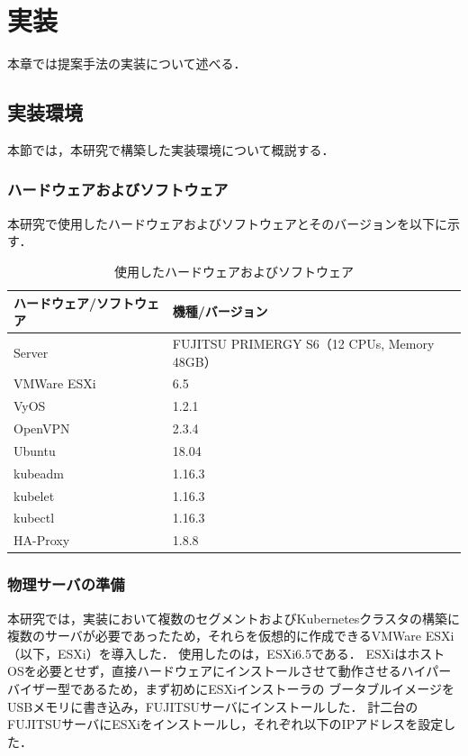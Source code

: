\chapter{実装}
\label{implementation}

本章では提案手法の実装について述べる．

\section{実装環境}
\label{implementation:environment}

本節では，本研究で構築した実装環境について概説する．

\subsection{ハードウェアおよびソフトウェア}
\label{implementation:environment:resouces}

本研究で使用したハードウェアおよびソフトウェアとそのバージョンを以下に示す．

\begin{table}[htb]
  \begin{center}
    \caption{使用したハードウェアおよびソフトウェア}
    \begin{tabular}{|l|l|} \hline
      ハードウェア/ソフトウェア & 機種/バージョン \\ \hline
      Server & FUJITSU PRIMERGY S6（12 CPUs, Memory 48GB） \\ \hline
      VMWare ESXi & 6.5 \\ \hline
      VyOS & 1.2.1 \\ \hline
      OpenVPN & 2.3.4 \\ \hline
      Ubuntu & 18.04 \\ \hline
      kubeadm & 1.16.3 \\ \hline
      kubelet & 1.16.3 \\ \hline
      kubectl & 1.16.3 \\ \hline
      HA-Proxy & 1.8.8 \\ \hline
    \end{tabular}
  \end{center}
\end{table}

\subsection{物理サーバの準備}
\label{implementation:esxi}

本研究では，実装において複数のセグメントおよびKubernetesクラスタの構築に複数のサーバが必要であったため，それらを仮想的に作成できるVMWare ESXi（以下，ESXi）を導入した．
使用したのは，ESXi6.5である．
ESXiはホストOSを必要とせず，直接ハードウェアにインストールさせて動作させるハイパーバイザー型であるため，まず初めにESXiインストーラの
ブータブルイメージをUSBメモリに書き込み，FUJITSUサーバにインストールした．
計二台のFUJITSUサーバにESXiをインストールし，それぞれ以下のIPアドレスを設定した．

